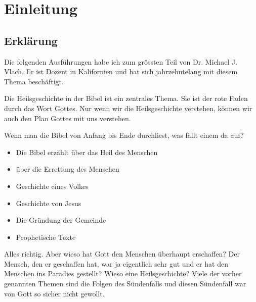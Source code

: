 \section{Einleitung}
        
\subsection{Erklärung}
Die folgenden Ausführungen habe ich zum grössten Teil von Dr. Michael J. Vlach. Er ist Dozent in Kalifornien und hat sich jahrzehntelang mit diesem Thema beschäftigt.

Die Heilsgeschichte in der Bibel ist ein zentrales Thema. Sie ist der rote Faden durch das Wort Gottes. Nur wenn wir die Heilsgeschichte verstehen, können wir auch den Plan Gottes mit uns verstehen.

Wenn man die Bibel von Anfang bis Ende durchliest, was fällt einem da auf?
\begin{itemize}
  \item Die Bibel erzählt über das Heil des Menschen
  \item über die Errettung des Menschen
  \item Geschichte eines Volkes
  \item Geschichte von Jesus
  \item Die Gründung der Gemeinde
  \item Prophetische Texte
\end{itemize}
Alles richtig. Aber wieso hat Gott den Menschen überhaupt erschaffen? Der Mensch, den er geschaffen hat, war ja eigentlich sehr gut und er hat den Menschen ins Paradies gestellt? Wieso eine Heilsgeschichte? Viele der vorher genannten Themen sind die Folgen des Sündenfalls und diesen Sündenfall war von Gott so sicher nicht gewollt. 

